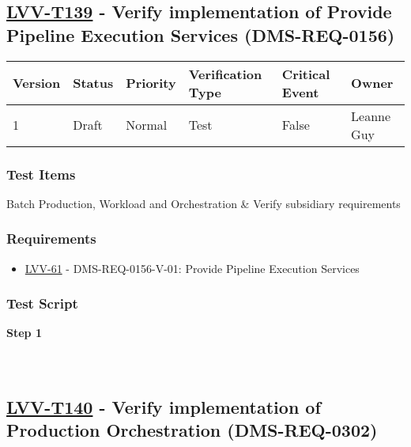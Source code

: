 \hypertarget{lvv-t139---verify-implementation-of-provide-pipeline-execution-services-dms-req-0156}{%
\subsection{\texorpdfstring{\href{https://jira.lsstcorp.org/secure/Tests.jspa\#/testCase/LVV-T139}{LVV-T139}
- Verify implementation of Provide Pipeline Execution Services
(DMS-REQ-0156)}{LVV-T139 - Verify implementation of Provide Pipeline Execution Services (DMS-REQ-0156)}}\label{lvv-t139---verify-implementation-of-provide-pipeline-execution-services-dms-req-0156}}

\begin{longtable}[]{@{}llllll@{}}
\toprule
Version & Status & Priority & Verification Type & Critical Event &
Owner\tabularnewline
\midrule
\endhead
1 & Draft & Normal & Test & False & Leanne Guy\tabularnewline
\bottomrule
\end{longtable}

\hypertarget{test-items-115}{%
\subsubsection{Test Items}\label{test-items-115}}

Batch Production, Workload and Orchestration \& Verify subsidiary
requirements

\hypertarget{requirements-116}{%
\subsubsection{Requirements}\label{requirements-116}}

\begin{itemize}
\tightlist
\item
  \href{https://jira.lsstcorp.org/browse/LVV-61}{LVV-61} -
  DMS-REQ-0156-V-01: Provide Pipeline Execution Services
\end{itemize}

\hypertarget{test-script-116}{%
\subsubsection{Test Script}\label{test-script-116}}

\textbf{Step 1}\\
~\\
~\\

\hypertarget{lvv-t140---verify-implementation-of-production-orchestration-dms-req-0302}{%
\subsection{\texorpdfstring{\href{https://jira.lsstcorp.org/secure/Tests.jspa\#/testCase/LVV-T140}{LVV-T140}
- Verify implementation of Production Orchestration
(DMS-REQ-0302)}{LVV-T140 - Verify implementation of Production Orchestration (DMS-REQ-0302)}}\label{lvv-t140---verify-implementation-of-production-orchestration-dms-req-0302}}


